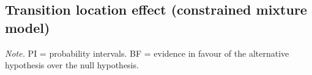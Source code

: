 \clearpage
\makeatletter
\efloat@restorefloats
\makeatother


\begin{appendix}
\section{}
\hypertarget{transition-location-effect-constrained-mixture-model}{%
\subsection{Transition location effect (constrained mixture
model)}\label{transition-location-effect-constrained-mixture-model}}

\begin{center}
\begin{ThreePartTable}

\begin{TableNotes}[para]
\normalsize{\textit{Note.} PI = probability intervals. BF = evidence in favour of the alternative hypothesis over the null hypothesis.}
\end{TableNotes}

\footnotesize{

}
\end{ThreePartTable}
\end{center}
\end{appendix}
